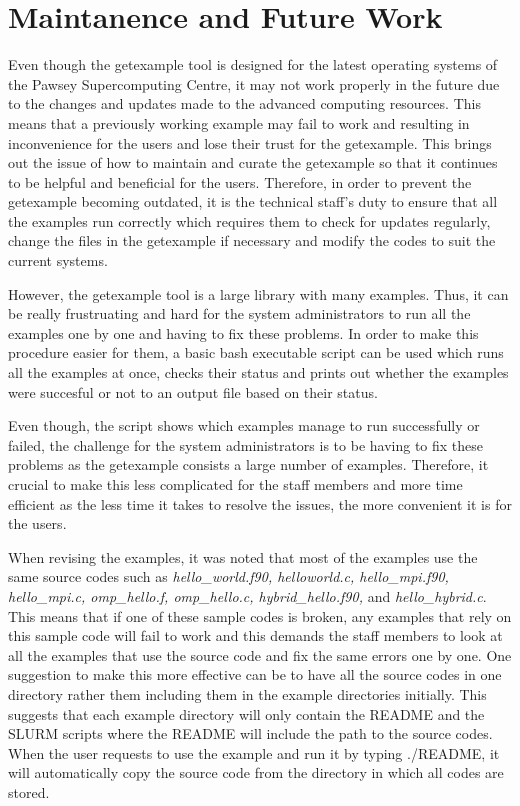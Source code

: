\section{Maintanence and Future Work}

Even though the getexample tool is designed for the latest operating systems of the Pawsey Supercomputing Centre, it may not work properly in the future
due to the changes and updates made to the advanced computing resources. This means that a previously working example may fail to work and resulting in 
inconvenience for the users and lose their trust for the getexample. This brings out the issue of how to maintain and curate the getexample so that it 
continues to be helpful and beneficial for the users. Therefore, in order to prevent the getexample becoming outdated, it is the technical staff's duty 
to ensure that all the examples run correctly which requires them to check for updates regularly, change the files in the getexample if necessary and 
modify the codes to suit the current systems.

However, the getexample tool is a large library with many examples. Thus, it can be really frustruating and hard for the system administrators to run 
all the examples one by one and having to fix these problems. In order to make this procedure easier for them, a basic bash executable script can be 
used which runs all the examples at once, checks their status and prints out whether the examples were succesful or not to an output file based on their
status.

Even though, the script shows which examples manage to run successfully or failed, the challenge for the system administrators is to be having to fix 
these problems as the getexample consists a large number of examples. Therefore, it crucial to make this less complicated for the staff members and more
time efficient as the less time it takes to resolve the issues, the more convenient it is for the users. 

When revising the examples, it was noted that most of the examples use the same source codes such as \emph{hello\_world.f90, helloworld.c, 
hello\_mpi.f90, hello\_mpi.c, omp\_hello.f, omp\_hello.c, hybrid\_hello.f90,} and \emph{hello\_hybrid.c}. This means that if one of these sample codes is
broken, any examples that rely on this sample code will fail to work and this demands the staff members to look at all the examples that use the source
code and fix the same errors one by one. One suggestion to make this more effective can be to have all the source codes in one directory rather them
including them in the example directories initially. This suggests that each example directory will only contain the README and the SLURM scripts where
the README will include the path to the source codes. When the user requests to use the example and run it by typing ./README, it will automatically
copy the source code from the directory in which all codes are stored.

